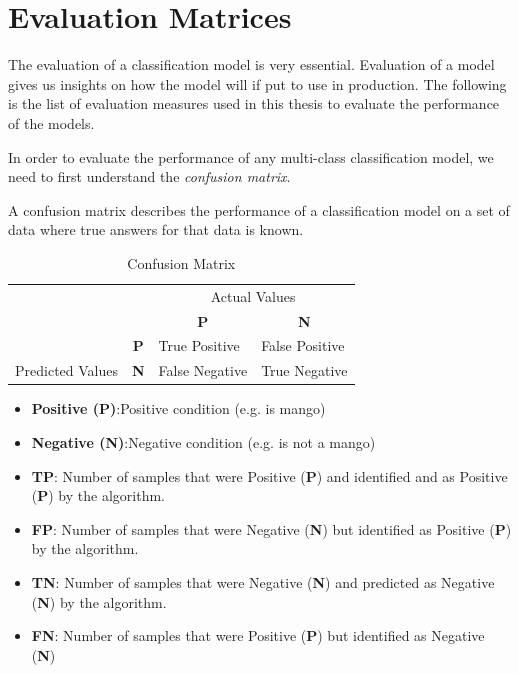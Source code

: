 \section{Evaluation Matrices}\label{backgroundEvaluationMatrices}

The evaluation of a classification model is very essential. Evaluation of a model gives us insights on how the model will if put to use in production. The following is the list of evaluation measures used in this thesis to evaluate the performance of the models. 

In order to evaluate the performance of any multi-class classification model, we need to first understand the \textit{confusion matrix}.

A confusion matrix describes the performance of a classification model on a set of data where true answers for that data is known.


\begin{table}[!ht]
\centering
\begin{tabular}{ll|l|l|}
\cline{3-4}
 &  & \multicolumn{2}{c|}{Actual Values} \\ \cline{3-4} 
 &  & \multicolumn{1}{c|}{\textbf{P}} & \multicolumn{1}{c|}{\textbf{N}} \\ \hline
\multicolumn{1}{|l|}{} & \multicolumn{1}{c|}{\textbf{P}} & True Positive & False Positive \\ \cline{2-4} 
\multicolumn{1}{|l|}{\multirow{-2}{*}{Predicted Values}} & \textbf{N} & False Negative & True Negative \\ \hline
\end{tabular}
\caption{Confusion Matrix}
\label{table:confMatrix}
\end{table}

\begin{itemize}
    \item \textbf{Positive (P)}:Positive condition (e.g. is mango)
    \item \textbf{Negative (N)}:Negative condition (e.g. is not a mango)
    \item \textbf{\gls{TP}}: Number of samples that were Positive  (\textbf{P}) and identified and as Positive (\textbf{P}) by the algorithm.
    \item \textbf{\gls{FP}}: Number of samples that were Negative (\textbf{N}) but identified as Positive  (\textbf{P}) by the algorithm.
    \item \textbf{\gls{TN}}: Number of samples that were Negative (\textbf{N}) and predicted as Negative (\textbf{N}) by the algorithm.
    \item \textbf{\gls{FN}}: Number of samples that were Positive (\textbf{P}) but identified as Negative (\textbf{N})
\end{itemize}



